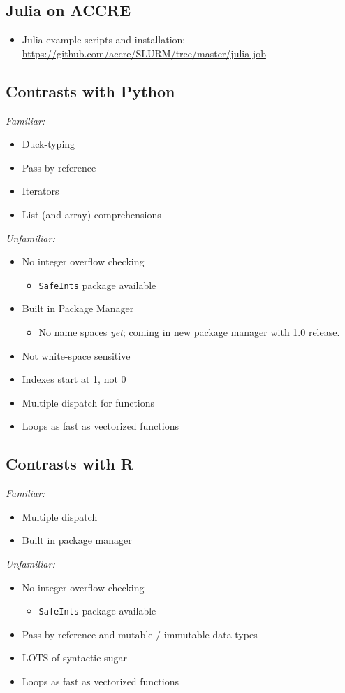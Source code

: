 \documentclass[12pt]{article}
\begin{document}
\subsection*{Julia on ACCRE}
\begin{itemize}
    \item Julia example scripts and installation: \url{https://github.com/accre/SLURM/tree/master/julia-job}
\end{itemize}


\subsection*{Contrasts with Python}
\emph{Familiar:}
\begin{itemize}
    \item Duck-typing
    \item Pass by reference
    \item Iterators
    \item List (and array) comprehensions
\end{itemize}
\emph{Unfamiliar:}
\begin{itemize}
    \item No integer overflow checking
    \begin{itemize}
        \item \texttt{SafeInts} package available
    \end{itemize}
    \item Built in Package Manager
    \begin{itemize}
        \item No name spaces \emph{yet}; coming in new package manager with 1.0 release.
    \end{itemize}
    \item Not white-space sensitive
    \item Indexes start at 1, not 0
    \item Multiple dispatch for functions
    \item Loops as fast as vectorized functions
\end{itemize}

\subsection*{Contrasts with R}
\emph{Familiar:}
\begin{itemize}
    \item Multiple dispatch
    \item Built in package manager
\end{itemize}
\emph{Unfamiliar:}
\begin{itemize}
    \item No integer overflow checking
    \begin{itemize}
        \item \texttt{SafeInts} package available
    \end{itemize}
    \item Pass-by-reference and mutable / immutable data types
    \item LOTS of syntactic sugar
    \item Loops as fast as vectorized functions
\end{itemize}
\end{document}
